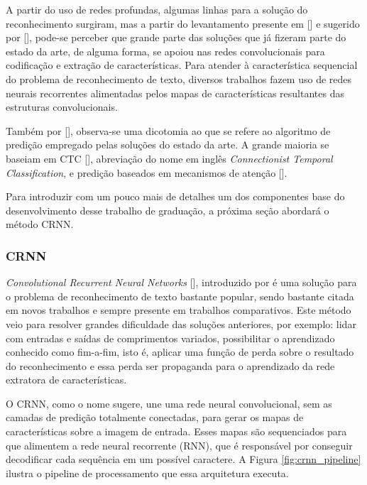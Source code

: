A partir do uso de redes profundas, algumas linhas para a solução do reconhecimento surgiram, mas a partir do levantamento presente em [] e sugerido por [], pode-se perceber que grande parte das soluções que já fizeram parte do estado da arte, de alguma forma, se apoiou nas redes convolucionais para codificação e extração de características.
Para atender à característica sequencial do problema de reconhecimento de texto, diversos trabalhos fazem uso de redes neurais recorrentes alimentadas pelos mapas de características resultantes das estruturas convolucionais.

Também por [], observa-se uma dicotomia ao que se refere ao algoritmo de predição empregado pelas soluções do estado da arte. A grande maioria se baseiam em CTC [], abreviação do nome em inglês \textit{Connectionist Temporal Classification}, e predição baseados em mecanismos de atenção [].

Para introduzir com um pouco mais de detalhes um dos componentes base do desenvolvimento desse trabalho de graduação, a próxima seção abordará o método CRNN.



\subsubsection{CRNN} \label{crnn}
\textit{Convolutional Recurrent Neural Networks} [], introduzido por \citeauthor{CRNN} é uma solução para o problema de reconhecimento de texto bastante popular, sendo bastante citada em novos trabalhos e sempre presente em trabalhos comparativos. Este método veio para resolver grandes dificuldade das soluções anteriores, por exemplo: lidar com entradas e saídas de comprimentos variados, possibilitar o aprendizado conhecido como fim-a-fim, isto é, aplicar uma função de perda sobre o resultado do reconhecimento e essa perda ser propaganda para o aprendizado da rede extratora de características.

O CRNN, como o nome sugere, une uma rede neural convolucional, sem as camadas de predição totalmente conectadas, para gerar os mapas de características sobre a imagem de entrada. Esses mapas são sequenciados para que alimentem a rede neural recorrente (RNN), que é responsável por conseguir decodificar cada sequência em um possível caractere. A Figura \ref{fig:crnn_pipeline} ilustra o pipeline de processamento que essa arquitetura executa.

